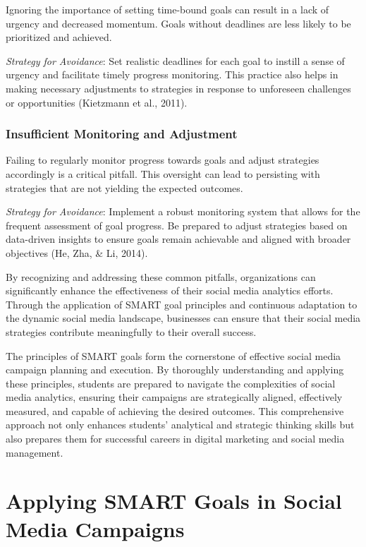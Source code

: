 \documentclass[
]{book}
\begin{document}
Ignoring the importance of setting time-bound goals can result in a lack of urgency and decreased momentum. Goals without deadlines are less likely to be prioritized and achieved.

\emph{Strategy for Avoidance}: Set realistic deadlines for each goal to instill a sense of urgency and facilitate timely progress monitoring. This practice also helps in making necessary adjustments to strategies in response to unforeseen challenges or opportunities (Kietzmann et al., 2011).

\hypertarget{insufficient-monitoring-and-adjustment}{%
\subsubsection*{Insufficient Monitoring and Adjustment}\label{insufficient-monitoring-and-adjustment}}

Failing to regularly monitor progress towards goals and adjust strategies accordingly is a critical pitfall. This oversight can lead to persisting with strategies that are not yielding the expected outcomes.

\emph{Strategy for Avoidance}: Implement a robust monitoring system that allows for the frequent assessment of goal progress. Be prepared to adjust strategies based on data-driven insights to ensure goals remain achievable and aligned with broader objectives (He, Zha, \& Li, 2014).

By recognizing and addressing these common pitfalls, organizations can significantly enhance the effectiveness of their social media analytics efforts. Through the application of SMART goal principles and continuous adaptation to the dynamic social media landscape, businesses can ensure that their social media strategies contribute meaningfully to their overall success.

The principles of SMART goals form the cornerstone of effective social media campaign planning and execution. By thoroughly understanding and applying these principles, students are prepared to navigate the complexities of social media analytics, ensuring their campaigns are strategically aligned, effectively measured, and capable of achieving the desired outcomes. This comprehensive approach not only enhances students' analytical and strategic thinking skills but also prepares them for successful careers in digital marketing and social media management.

\hypertarget{applying-smart-goals-in-social-media-campaigns}{%
\section*{Applying SMART Goals in Social Media Campaigns}\label{applying-smart-goals-in-social-media-campaigns}}
\end{document}
